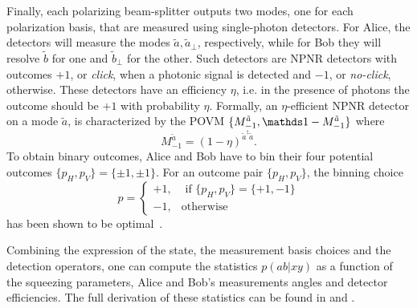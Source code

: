 Finally, each polarizing beam-splitter outputs two modes, one for each polarization basis, that are measured using single-photon detectors.
For Alice, the detectors will measure the modes $\tilde{a},\tilde{a}_\perp$, respectively, while for Bob they will resolve $\tilde{b}$ for one and $\tilde{b}_\perp$ for the other.
Such detectors are \acrfull{NPNR} detectors with outcomes $+1$, or \textit{click}, when a photonic signal is detected and $-1$, or \textit{no-click}, otherwise.
These detectors have an efficiency $\eta$, i.e. in the presence of photons the outcome should be $+1$ with probability $\eta$.
Formally, an $\eta$-efficient NPNR detector on a mode $\tilde{a}$, is characterized by the POVM $\{M_{-1}^{\tilde{a}},\id-M_{-1}^{\tilde{a}}\}$ where
\begin{equation}
	M_{-1}^{\tilde{a}} = (1-\eta)^{\tilde{a}^\dag\tilde{a}}.
\end{equation}
To obtain binary outcomes, Alice and Bob have to bin their four potential outcomes $\{p_H,p_V\}=\{\pm1,\pm1\}$.
For an outcome pair $\{p_H,p_V\}$, the binning choice
\begin{equation}
	p=\begin{cases}
		+1, &\text{ if } \{p_H,p_V\}=\{+1,-1\}\\
		-1, &\text{otherwise}
	\end{cases}
\end{equation}
has been shown to be optimal~\cite{Vivoli2015b}.

Combining the expression of the state, the measurement basis choices and the detection operators, one can compute the statistics $p(ab|xy)$ as a function of the squeezing parameters, Alice and Bob's measurements angles and detector efficiencies.
The full derivation of these statistics can be found in \cite{Vivoli2015b} and \cite{Ho2020}.

\medbreak

